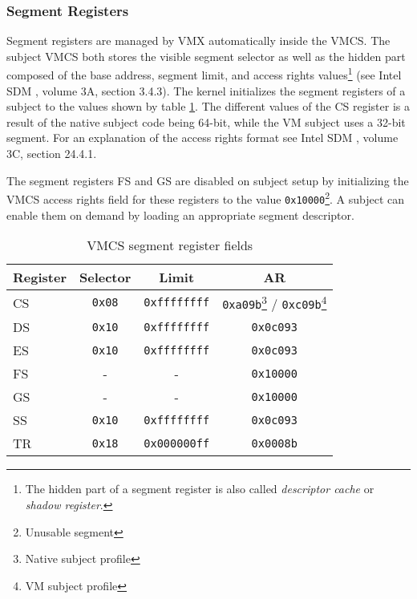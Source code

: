 \subsubsection{Segment Registers}
Segment registers are managed by VMX automatically inside the VMCS. The subject
VMCS both stores the visible segment selector as well as
the hidden part composed of the base address, segment limit, and access rights
values\footnote{The hidden part of a segment register is also called
\emph{descriptor cache} or \emph{shadow register}.} (see Intel SDM
\cite{IntelSDM}, volume 3A, section 3.4.3). The kernel initializes the segment
registers of a subject to the values shown by table \ref{tab:vmcs-segment-regs}.
The different values of the CS register is a result of the native subject code
being 64-bit, while the VM subject uses a 32-bit segment. For an explanation of
the access rights format see Intel SDM \cite{IntelSDM}, volume 3C,
section 24.4.1.

The segment registers FS and GS are disabled on subject setup by initializing
the VMCS access rights field for these registers to the value
\texttt{0x10000}\footnote{Unusable segment}.  A subject can enable them on
demand by loading an appropriate segment descriptor.

\begin{table}[h]
	\centering
	\begin{minipage}[c]{8cm}
	\begin{tabular}{l|c|c|c}
		\textbf{Register} & \textbf{Selector} & \textbf{Limit} & \textbf{AR} \\
		\hline
		CS & \texttt{0x08} & \texttt{0xffffffff} &
		\texttt{0xa09b}\footnote{Native subject profile} /
		 \texttt{0xc09b}\footnote{VM subject profile} \\
		DS & \texttt{0x10} & \texttt{0xffffffff} & \texttt{0x0c093} \\
		ES & \texttt{0x10} & \texttt{0xffffffff} & \texttt{0x0c093} \\
		FS & -             & -                   & \texttt{0x10000} \\
		GS & -             & -                   & \texttt{0x10000} \\
		SS & \texttt{0x10} & \texttt{0xffffffff} & \texttt{0x0c093} \\
		TR & \texttt{0x18} & \texttt{0x000000ff} & \texttt{0x0008b} \\
	\end{tabular}
	\end{minipage}
	\caption{VMCS segment register fields}
	\label{tab:vmcs-segment-regs}
\end{table}

